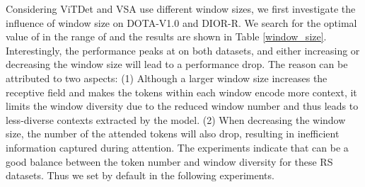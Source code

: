 \documentclass[10pt, journal,twoside]{IEEEtran}
\begin{document}
Considering ViTDet \cite{vitdet} and VSA \cite{zhang2022vsa} use different window sizes, we first investigate the influence of window size  on DOTA-V1.0 and DIOR-R. We search for the optimal value of  in the range of  and the results are shown in Table \ref{window_size}. Interestingly, the performance peaks at  on both datasets, and either increasing or decreasing the window size will lead to a performance drop. The reason can be attributed to two aspects: (1) Although a larger window size increases the receptive field and makes the tokens within each window encode more context, it limits the window diversity due to the reduced window number  and thus leads to less-diverse contexts extracted by the model. (2) When decreasing the window size, the number of the attended tokens will also drop, resulting in inefficient information captured during attention. The experiments indicate that  can be a good balance between the token number and window diversity for these RS datasets. Thus we set  by default in the following experiments.

\begin{table}[t]
  \caption{The mAP (\%) of different ViT-B variants on DOTA-V1.0 and DIOR-R datasets. The suffix denotes different window attention methods. WA: window attention. SF: scale factor. OF: offset factor. RF: rotation factor.}
  \newcommand{\tabincell}[2]{\begin{tabular}{@{}#1@{}}#2\end{tabular}}
  \centering
  \begin{threeparttable}
\end{threeparttable}
  \label{vit_windows}
\end{table}
\end{document}
